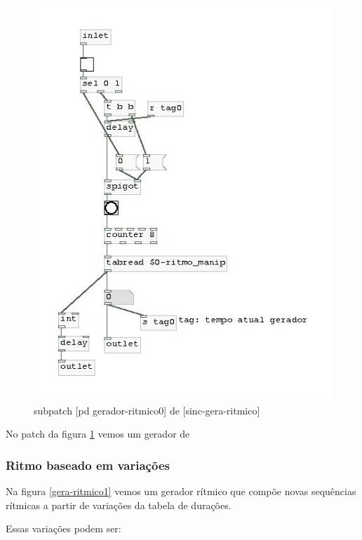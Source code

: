 \documentclass{ppgmus}
\begin{document}
\begin{figure}[!ht]
\includegraphics[scale=.6]{gerador-ritmico0}
\caption{subpatch [pd gerador-ritmico0] de [sinc-gera-ritmico]}
\label{gera-ritmico0}
\end{figure}   


No patch da figura \ref{gera-ritmico0} vemos um gerador de



 \subsubsection{Ritmo baseado em variações}


Na figura \ref{gera-ritmico1} vemos um gerador rítmico
que compõe novas sequências rítmicas a partir de variações
da tabela de durações.

Essas variações podem ser:
\end{document}
